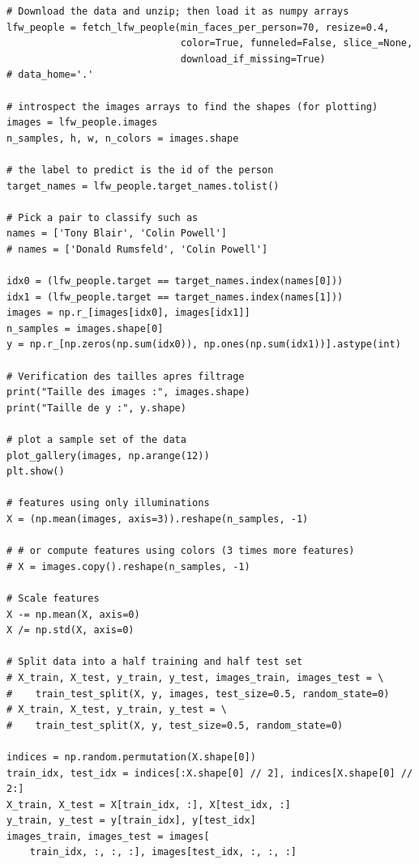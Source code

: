 \documentclass{article}
\begin{document}
\begin{lstlisting}
# Download the data and unzip; then load it as numpy arrays
lfw_people = fetch_lfw_people(min_faces_per_person=70, resize=0.4,
                              color=True, funneled=False, slice_=None,
                              download_if_missing=True)
# data_home='.'

# introspect the images arrays to find the shapes (for plotting)
images = lfw_people.images
n_samples, h, w, n_colors = images.shape

# the label to predict is the id of the person
target_names = lfw_people.target_names.tolist()

# Pick a pair to classify such as
names = ['Tony Blair', 'Colin Powell']
# names = ['Donald Rumsfeld', 'Colin Powell']

idx0 = (lfw_people.target == target_names.index(names[0]))
idx1 = (lfw_people.target == target_names.index(names[1]))
images = np.r_[images[idx0], images[idx1]]
n_samples = images.shape[0]
y = np.r_[np.zeros(np.sum(idx0)), np.ones(np.sum(idx1))].astype(int)

# Verification des tailles apres filtrage
print("Taille des images :", images.shape)
print("Taille de y :", y.shape)

# plot a sample set of the data
plot_gallery(images, np.arange(12))
plt.show()

# features using only illuminations
X = (np.mean(images, axis=3)).reshape(n_samples, -1)

# # or compute features using colors (3 times more features)
# X = images.copy().reshape(n_samples, -1)

# Scale features
X -= np.mean(X, axis=0)
X /= np.std(X, axis=0)

# Split data into a half training and half test set
# X_train, X_test, y_train, y_test, images_train, images_test = \
#    train_test_split(X, y, images, test_size=0.5, random_state=0)
# X_train, X_test, y_train, y_test = \
#    train_test_split(X, y, test_size=0.5, random_state=0)

indices = np.random.permutation(X.shape[0])
train_idx, test_idx = indices[:X.shape[0] // 2], indices[X.shape[0] // 2:]
X_train, X_test = X[train_idx, :], X[test_idx, :]
y_train, y_test = y[train_idx], y[test_idx]
images_train, images_test = images[
    train_idx, :, :, :], images[test_idx, :, :, :]
\end{lstlisting}
\end{document}
